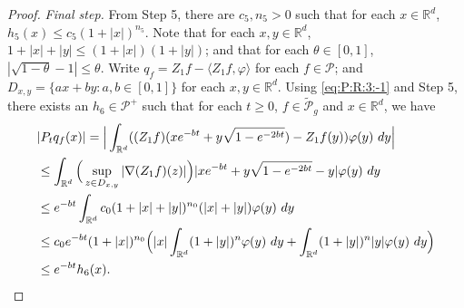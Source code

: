 \documentclass[12pt,a4paper]{amsart}
\theoremstyle{plain}
\theoremstyle{definition}
\numberwithin{equation}{section}
\begin{document}
\begin{proof}
\emph{Final step.} From Step 5, there are $c_5,n_5> 0$ such that for each $x\in \mathbb R^d$, $h_5(x) \leq c_5(1+|x|)^{n_5}$. 
Note that for each $x, y \in \mathbb R^d$, $1+|x|+|y|\leq (1+|x|) (1+|y|)$;
and that for each $\theta \in [0,1]$, $|\sqrt {1 - \theta} - 1| \leq \theta$.
Write $q_f = Z_1f - \langle Z_1f, \varphi\rangle$ for each $f\in \mathcal P$; and $D_{x,y} = \{ax+by: a, b \in [0,1]\}$ for each $x, y \in \mathbb R^d$. 
Using \eqref{eq:P:R:3:-1} and Step 5, there exists an $h_6 \in \mathcal P^+$ such that for each $t \geq 0$, $f \in \widetilde {\mathcal P}_g$ and $x \in \mathbb R^d$, we have
  \begin{align}
    & |P_t q_f(x)|
      = \Big| \int_{\mathbb R^d} ( (Z_1f)(x e^{-bt}+ y \sqrt{1 - e^{-2bt}}) - Z_1 f (y) ) \varphi(y) ~dy \Big| \\
    & \leq \int_{\mathbb R^d} \Big(\sup_{z\in D_{x,y}} |\nabla  (Z_1f) (z) |\Big) | x e^{-bt} + y \sqrt{1 - e^{-2bt}} - y | \varphi(y) ~dy \\
    & \leq e^{-bt} \int_{\mathbb R^d} c_0(1+|x|+|y|)^{n_0} (|x|+|y|) \varphi(y) ~dy \\
    & \leq c_0 e^{-bt}(1+|x|)^{n_0}\Big(|x|\int_{\mathbb R^d} (1+|y|)^n\varphi(y) ~dy + \int_{\mathbb R^d} (1+ |y|)^n |y| \varphi(y) ~dy \Big) \\
    & \leq e^{-bt} h_6(x).
      \qedhere
  \end{align}
\end{proof}
\end{document}

